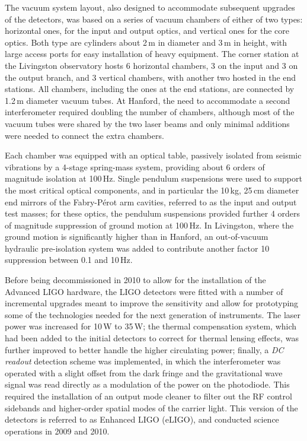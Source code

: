 The vacuum system layout, also designed to accommodate subsequent upgrades of the detectors, was based on a series of vacuum chambers of either of two types: horizontal ones, for the input and output optics, and vertical ones for the core optics.
Both type are cylinders about 2\,m in diameter and 3\,m in height, with large access ports for easy installation of heavy equipment.
The corner station at the Livingston observatory hosts 6 horizontal chambers, 3 on the input and 3  on the output branch, and 3 vertical chambers, with another two hosted in the end stations.
All chambers, including the ones at the end stations, are connected by 1.2\,m diameter vacuum tubes.
At Hanford, the need to accommodate a second interferometer required doubling the number of chambers, although most of the vacuum tubes were shared by the two laser beams and only minimal additions were needed to connect the extra chambers.

Each chamber was equipped with an optical table, passively isolated from seismic vibrations by a 4-stage spring-mass system, providing about 6 orders of magnitude isolation at 100\,Hz\cite{Giaime_1996}.
Single pendulum suspensions were used to support the most critical optical components, and in particular the 10\,kg, 25\,cm diameter end mirrors of the Fabry-P\'{e}rot arm cavities, referred to as the input and output test masses; for these optics, the pendulum suspensions provided further 4 orders of magnitude suppression of ground motion at 100\,Hz.
In Livingston, where the ground motion is significantly higher than in Hanford, an out-of-vacuum hydraulic pre-isolation system was added to contribute another factor 10 suppression between 0.1 and 10\,Hz.

Before being decommissioned in 2010 to allow for the installation of the Advanced LIGO hardware, the LIGO detectors were fitted with a number of incremental upgrades\cite{Aasi_2015} meant to improve the sensitivity and allow for prototyping some of the technologies needed for the next generation of instruments.
The laser power was increased for 10\,W to 35\,W;
the thermal compensation system, which had been added to the initial detectors to correct for thermal lensing effects, was further improved to better handle the higher circulating power;
finally, a \textit{DC readout} detection scheme was implemented, in which the interferometer was operated with a slight offset from the dark fringe and the gravitational wave signal was read directly as a modulation of the power on the photodiode.
This required the installation of an output mode cleaner to filter out the RF control sidebands and higher-order spatial modes of the carrier light.
This version of the detectors is referred to as Enhanced LIGO (eLIGO), and conducted science operations in 2009 and 2010. 

